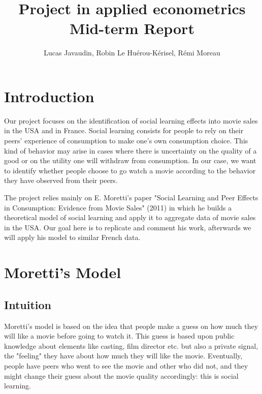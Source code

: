 \documentclass{article}
\title{Project in applied econometrics\\ Mid-term Report}
\author{Lucas Javaudin, Robin Le Huérou-Kérisel, Rémi Moreau}
\begin{document}
\maketitle


\section{Introduction}

Our project focuses on the identification of social learning effects into movie sales in the USA and in France. Social learning consists for people to rely on their peers' experience of consumption to make one's own consumption choice. This kind of behavior may arise in cases where there is uncertainty on the quality of a good or on the utility one will withdraw from consumption. In our case, we want to identify whether people choose to go watch a movie according to the behavior they have observed from their peers. 

The project relies mainly on E. Moretti's paper "Social Learning and Peer Effects in Consumption: Evidence from Movie Sales" (2011) in which he builds a theoretical model of social learning and apply it to aggregate data of movie sales in the USA. Our goal here is to replicate and comment his work, afterwards we will apply his model to similar French data.  


\section{Moretti's Model}

\subsection{Intuition}

Moretti's model is based on the idea that people make a guess on how much they will like a movie before going to watch it. This guess is based upon public knowledge about elements like casting, film director etc. but also a private signal, the "feeling" they have about how much they will like the movie. Eventually, people have peers who went to see the movie and other who did not, and they might change their guess about the movie quality accordingly: this is social learning. 
\end{document}
